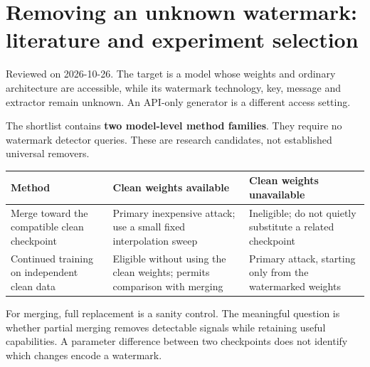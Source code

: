 \section{Removing an unknown watermark: literature and experiment
selection}\label{record-docs-watermark-removal-literature-md-removing-an-unknown-watermark-literature-and-experiment-selection}

Reviewed on 2026-10-26. The target is a model whose weights and ordinary
architecture are accessible, while its watermark technology, key,
message and extractor remain unknown. An API-only generator is a
different access setting.

The shortlist contains \textbf{two model-level method families}. They
require no watermark detector queries. These are research candidates,
not established universal removers.

{\scriptsize\setlength{\tabcolsep}{3pt} %
\begin{longtable}[]{@{}
  >{\raggedright\arraybackslash}p{}
  >{\raggedright\arraybackslash}p{}
  >{\raggedright\arraybackslash}p{}@{}}
\toprule\noalign{}
\begin{minipage}[b]{\linewidth}\raggedright
Method
\end{minipage} & \begin{minipage}[b]{\linewidth}\raggedright
Clean weights available
\end{minipage} & \begin{minipage}[b]{\linewidth}\raggedright
Clean weights unavailable
\end{minipage} \\
\midrule\noalign{}
\endhead
\bottomrule\noalign{}
\endlastfoot
Merge toward the compatible clean checkpoint & Primary inexpensive
attack; use a small fixed interpolation sweep & Ineligible; do not
quietly substitute a related checkpoint \\
Continued training on independent clean data & Eligible without using
the clean weights; permits comparison with merging & Primary attack,
starting only from the watermarked weights \\
\end{longtable}
}

For merging, full replacement is a sanity control. The meaningful
question is whether partial merging removes detectable signals while
retaining useful capabilities. A parameter difference between two
checkpoints does not identify which changes encode a watermark.

